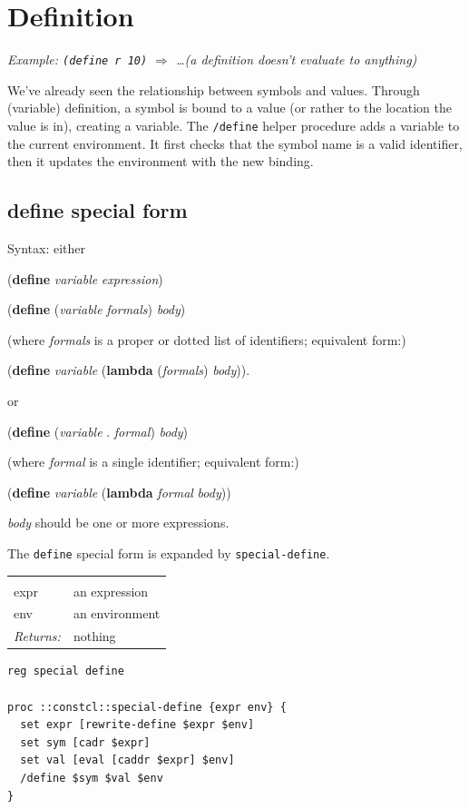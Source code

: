 \documentclass[twoside,9pt]{report}
\begin{document}
\section{Definition}
\label{definition}


\emph{Example: \texttt{(define r 10)} $\Rightarrow$ \ldots  (a definition doesn't evaluate to anything)}


We've already seen the relationship between symbols and values. Through (variable) definition, a symbol is bound to a value (or rather to the location the value is in), creating a variable. The \texttt{/define} helper procedure adds a variable to the current environment. It first checks that the symbol name is a valid identifier, then it updates the environment with the new binding.

\subsection{define special form}
\label{define-special-form}


Syntax: either


(\textbf{define} \emph{variable} \emph{expression})


(\textbf{define} (\emph{variable} \emph{formals}) \emph{body})


(where \emph{formals} is a proper or dotted list of identifiers; equivalent form:)


(\textbf{define} \emph{variable} (\textbf{lambda} (\emph{formals}) \emph{body})).


or


(\textbf{define} (\emph{variable} . \emph{formal}) \emph{body})


(where \emph{formal} is a single identifier; equivalent form:)


(\textbf{define} \emph{variable} (\textbf{lambda} \emph{formal} \emph{body}))


\emph{body} should be one or more expressions.


The \texttt{define} special form is expanded by \texttt{special-define}.

\noindent\begin{tabular}{ |p{1.9cm} p{8cm}| }
\hline
\rowcolor[HTML]{CCCCCC} \multicolumn{2}{|l|}{\bf special-define (internal)} \\
expr & an expression \\
env & an environment \\
\textit{Returns:} & nothing \\
\hline
\end{tabular}
\begin{lstlisting}
reg special define

proc ::constcl::special-define {expr env} {
  set expr [rewrite-define $expr $env]
  set sym [cadr $expr]
  set val [eval [caddr $expr] $env]
  /define $sym $val $env
}
\end{lstlisting}
\end{document}
